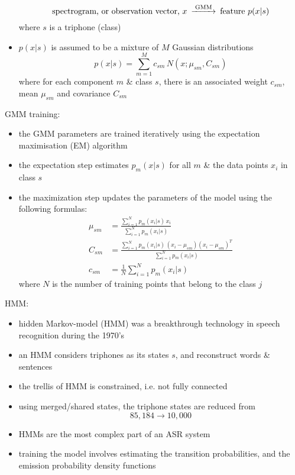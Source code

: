\documentclass[onecolumn]{IEEEtran}
\newcommand{\beq}{\begin{equation}}
\newcommand{\eeq}{\end{equation}}
\newcommand{\bi}{\begin{itemize}}
\newcommand{\ei}{\end{itemize}}
\begin{document}
\begin{itemize}
        \beq\begin{CD}
            \text{spectrogram, or observation vector, } x  @>\text{GMM}>>  \text{feature } p(x|s)
        \end{CD}\eeq
        where $s$ is a triphone (class)
        \item $p(x|s)$ is assumed to be a mixture of $M$ Gaussian distributions
        \beq
            p(x|s) = \sum_{m =1}^M c_{sm} \, N(x; \mu_{sm}, C_{sm})
        \eeq
        where for each component $m$ \& class $s$, there is an associated weight $c_{sm}$, mean $\mu_{sm}$ and covariance $ C_{sm}$
    \ei
    \item GMM training:
    \bi
         \item the GMM parameters are trained iteratively using the expectation maximisation (EM) algorithm
         \item the expectation step estimates $p_m(x|s)$ for all $m$ \& the data points $x_i$ in class $s$
         \item the maximization step updates the parameters of the model using the following formulas:
         \beq\begin{split}
            \mu_{sm} &= \frac{\sum_{i=1}^N p_m(x_i|s)\, x_i}{\sum_{i=1}^N p_m(x_i|s)}\\
            C_{sm}   &= \frac{\sum_{i=1}^N p_m(x_i|s)\, (x_i- \mu_{sm})(x_i- \mu_{sm})^T}{\sum_{i=1}^N p_m(x_i|s)}\\
            c_{sm} &= \frac{1}{N} \sum_{i=1}^N p_m(x_i|s)
         \end{split}\eeq
         where $N$ is the number of training points that belong to the class $j$
    \ei
    \item HMM:
    \bi
        \item hidden Markov-model (HMM) was a breakthrough technology in speech recognition during the 1970's
        \item an HMM considers triphones as its states $s$, and reconstruct words \& sentences
        \item the trellis of HMM is constrained, i.e.  not fully connected
        \item using merged/shared states, the triphone states are reduced from
        \beq
             85,184 \rightarrow 10,000
        \eeq
        \item HMMs are the most complex part of an ASR system
        \item training the model involves estimating the transition probabilities, and the emission probability density functions

\end{itemize}
\end{document}
